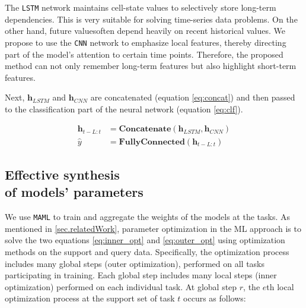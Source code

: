 \documentclass[aps,prb,groupedaddress,twocolumn,showpacs,dvipdfmx,superscriptaddress,pdftex]{revtex4-2}
\begin{document}
The \verb|LSTM| network maintains cell-state values ​​to selectively store long-term dependencies. This is very suitable for solving time-series data problems. On the other hand, future values ​​often depend heavily on recent historical values. We propose to use the \verb|CNN| network to emphasize local features, thereby directing part of the model's attention to certain time points. Therefore, the proposed method can not only remember long-term features but also highlight short-term features.

\vspace{2mm}


Next, $\mathbf{h}_{LSTM}$ and $\mathbf{h}_{CNN}$ are concatenated (equation \ref{eq:concat}) and then passed to the classification part of the neural network (equation \ref{eq:clf}).

\begin{align}
    \mathbf{h}_{t-L:t} &= \mathbf{Concatenate}\left( \mathbf{h}_{LSTM}, \mathbf{h}_{CNN} \right) \label{eq:concat} \\
    \hat y &= \mathbf{FullyConnected}\left( \mathbf{h}_{t-L:t} \right) \label{eq:clf}
\end{align}

\subsection{Effective synthesis\\of models' parameters}


We use \verb|MAML| to train and aggregate the weights of the models at the tasks. As mentioned in \ref{sec.relatedWork}, parameter optimization in the ML approach is to solve the two equations \ref{eq:inner_opt} and \ref{eq:outer_opt} using optimization methods on the support and query data. Specifically, the optimization process includes many global steps (outer optimization), performed on all tasks participating in training. Each global step includes many local steps (inner optimization) performed on each individual task. At global step $r$, the $e$th local optimization process at the support set of task $t$ occurs as follows:
\end{document}
